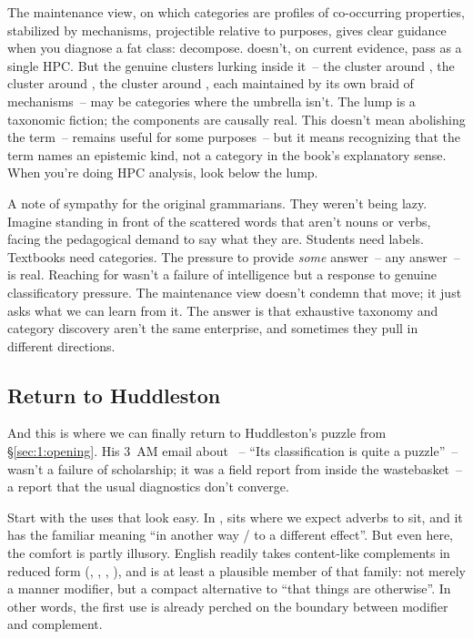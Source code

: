 The maintenance view, on which categories are profiles of co-occurring properties, stabilized by mechanisms, projectible relative to purposes, gives clear guidance when you diagnose a fat class: decompose.  doesn't, on current evidence, pass as a single HPC. But the genuine clusters lurking inside it~-- the cluster around , the cluster around , the cluster around , each maintained by its own braid of mechanisms~-- may be categories where the umbrella isn't. The lump is a taxonomic fiction; the components are causally real. This doesn't mean abolishing the term~--  remains useful for some purposes~-- but it means recognizing that the term names an epistemic kind, not a category in the book's explanatory sense. When you're doing HPC analysis, look below the lump.

A note of sympathy for the original grammarians. They weren't being lazy. Imagine standing in front of the scattered words that aren't nouns or verbs, facing the pedagogical demand to say what they are. Students need labels. Textbooks need categories. The pressure to provide \emph{some} answer~-- any answer~-- is real. Reaching for  wasn't a failure of intelligence but a response to genuine classificatory pressure. The maintenance view doesn't condemn that move; it just asks what we can learn from it. The answer is that exhaustive taxonomy and category discovery aren't the same enterprise, and sometimes they pull in different directions.

\subsection{Return to Huddleston}
\label{sec:8:return-huddleston}

And this is where we can finally return to Huddleston's puzzle from §\ref{sec:1:opening}. His 3~AM email about ~-- \enquote{Its classification is quite a puzzle}~-- wasn't a failure of scholarship; it was a field report from inside the wastebasket~-- a report that the usual diagnostics don't converge.

Start with the uses that look easy. In ,  sits where we expect adverbs to sit, and it has the familiar meaning \enquote{in another way / to a different effect}. But even here, the comfort is partly illusory. English  readily takes content-like complements in reduced form (, , , ), and  is at least a plausible member of that family: not merely a manner modifier, but a compact alternative to \enquote{that things are otherwise}. In other words, the first use is already perched on the boundary between modifier and complement.

